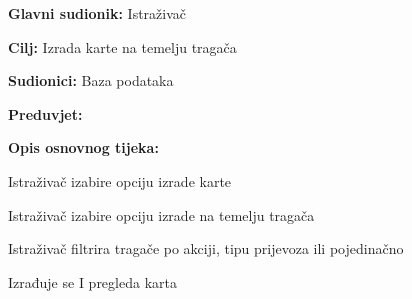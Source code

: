 					\noindent {}
					\begin{packed_item}
	
						\item \textbf{Glavni sudionik: } Istraživač
						\item  \textbf{Cilj:} Izrada karte na temelju tragača
						\item  \textbf{Sudionici:} Baza podataka
						\item  \textbf{Preduvjet:}
						\item  \textbf{Opis osnovnog tijeka:}
						
						\item[] \begin{packed_enum}
	
							\item 	Istraživač izabire opciju izrade karte
							\item Istraživač izabire opciju izrade na temelju tragača
							\item Istraživač filtrira tragače po akciji, tipu prijevoza ili pojedinačno
							\item Izrađuje se I pregleda karta
							
							
						\end{packed_enum}
					\end{packed_item}%
					\noindent {}
